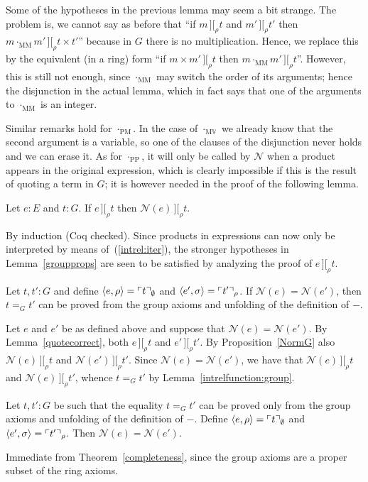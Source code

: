 \documentclass[numreferences]{kluwer}
\newcommand{\intII}{\,]\![}
\newcommand{\intrel}{\mathbin{\intII_{\rho}}}
\newcommand{\N}{\ensuremath{\mathcal{N}}}
\newcommand{\V}{{\mathbb V}}
\newcommand{\mlfn}[2]{\ensuremath\ulcorner{#1}\urcorner_{#2}}
\newcommand{\multMV}{\ensuremath{\cdot_{\mathrm M\V}}}
\newcommand{\multMM}{\ensuremath{\cdot_{\mathrm{MM}}}}
\newcommand{\multPM}{\ensuremath{\cdot_{\mathrm{PM}}}}
\newcommand{\multPP}{\ensuremath{\cdot_{\mathrm{PP}}}}
\begin{document}
\begin{article}
Some of the hypotheses in the previous lemma may seem a bit strange.  The
problem is, we cannot say as before that ``if $m\intrel t$ and $m'\intrel t'$
then $m\multMM m'\intrel t\times t'$'' because in $G$ there is no
multiplication.  Hence, we replace this by the equivalent (in a ring) form
``if $m\times m'\intrel t$ then $m\multMM m'\intrel t$''.  However, this
is still not enough, since {\multMM} may switch the order of its arguments;
hence the disjunction in the actual lemma, which in fact says that one of
the arguments to {\multMM} is an integer.

Similar remarks hold for {\multPM}.  In the case of {\multMV} we already
know that the second argument is a variable, so one of the clauses of the
disjunction never holds and we can erase it.  As for {\multPP}, it will only
be called by $\N$ when a product appears in the original expression, which
is clearly impossible if this is the result of quoting a term in $G$;
it is however needed in the proof of the following lemma.

\begin{lemma}\label{NormG} Let $e:E$ and $t:G$.  If $e\intrel t$ then
$\N(e)\intrel t$.
\end{lemma}
\begin{pf}
By induction (Coq checked).  Since products in expressions can now only be
interpreted by means of~(\ref{intrel:iter}), the stronger hypotheses
in Lemma~\ref{groupprops} are seen to be satisfied by analyzing the proof
of $e\intrel t$.
\end{pf}

\begin{corollary}\label{correctness:group}
Let $t,t':G$ and define $\langle e,\rho\rangle=\mlfn{t}{\emptyset}$ and
$\langle e',\sigma\rangle=\mlfn{t'}{\rho}$.  If $\N(e)=\N(e')$, then
$t=_G t'$ can be proved from the group axioms and unfolding of
the definition of $-$.
\end{corollary}
\begin{pf}
Let $e$ and $e'$ be as defined above and suppose that $\N(e)=\N(e')$.
By Lemma~\ref{quotecorrect}, both $e\intrel t$ and $e'\intrel t'$.
By Proposition~\ref{NormG} also $\N(e)\intrel t$ and $\N(e')\intrel t'$.
Since $\N(e)=\N(e')$, we have that $\N(e)\intrel t$ and $\N(e)\intrel t'$,
whence $t=_G t'$ by Lemma~\ref{intrelfunction:group}.
\end{pf}

\begin{theorem}\label{completeness:group}
Let $t,t':G$ be such that the equality $t=_G t'$ can be proved
only from the group axioms and unfolding of the definition of $-$.  Define
$\langle e,\rho\rangle=\mlfn{t}{\emptyset}$ and
$\langle e',\sigma\rangle=\mlfn{t'}{\rho}$.  Then $\N(e)=\N(e')$.
\end{theorem}
\begin{pf}
Immediate from Theorem~\ref{completeness}, since the group axioms are a
proper subset of the ring axioms.
\end{pf}


\end{article}
\end{document}
